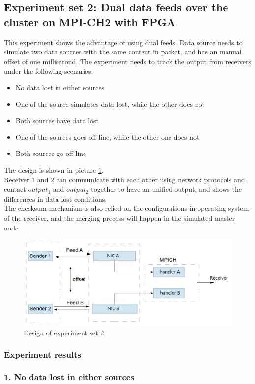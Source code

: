 \documentclass[11pt,openright,a4paper]{report}
\begin{document}
\subsection{Experiment set 2: Dual data feeds over the cluster on MPI-CH2 with FPGA}
This experiment shows the advantage of using dual feeds. Data source needs to simulate two data sources with the same content in packet, and has an manual offset of one millisecond. The experiment needs to track the output from receivers under the following scenarios:
\begin{itemize}
	\item No data lost in either sources
	\item One of the source simulates data lost, while the other does not
	\item Both sources have data lost
	\item One of the sources goes off-line, while the other one does not
	\item Both sources go off-line
\end{itemize}
The design is shown in picture \ref{fig:exp3}.\\
Receiver 1 and 2 can communicate with each other using network protocols and contact $output_{1}$ and $output_{2}$ together to have an unified output, and shows the differences in data lost conditions.\\
The checksum mechanism is also relied on the configurations in operating system of the receiver, and the merging process will happen in the simulated master node.\\ 
\begin{figure}[H]
	\centering
	\includegraphics[width=0.8\linewidth]{picture/exp3}
	\caption{Design of experiment set 2}
	\label{fig:exp3}
\end{figure}
\subsubsection{Experiment results}
\subsubsection{1. No data lost in either sources}
\end{document}
